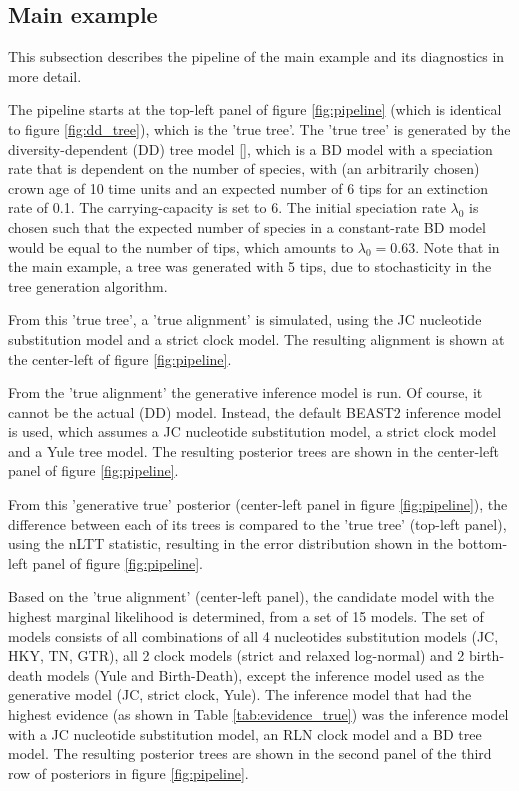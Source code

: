 \newpage

\subsection{Main example}
\label{subsec:main_example}

This subsection describes the pipeline of the main example 
and its diagnostics in more detail. 

The pipeline starts at the top-left panel of figure \ref{fig:pipeline} (which 
is identical to figure \ref{fig:dd_tree}),
which is the 'true tree'.
The 'true tree' is generated by the diversity-dependent (DD) 
tree model [\citep{DDD, etienne2012diversity}],
which is a BD model with a speciation rate that is dependent on the number of species,
with (an arbitrarily chosen) crown age of 10 time units 
and an expected number of 6 tips for an extinction rate of 0.1. 
The carrying-capacity is set to 6. 
The initial speciation rate $\lambda_0$ is chosen 
such that the expected number of species in a constant-rate BD model 
would be equal to the number of tips, which amounts to $\lambda_0 = 0.63$.
Note that in the main example, a tree was generated with 5 tips, due
to stochasticity in the tree generation algorithm.

From this 'true tree', a 'true alignment' is simulated, using
the JC nucleotide substitution model and a strict clock model.
The resulting alignment is shown at the center-left
of figure \ref{fig:pipeline}.

From the 'true alignment' the generative inference model is run.
Of course, it cannot be the actual (DD) model. Instead, the
default BEAST2 inference model is used, which assumes a JC nucleotide
substitution model, a strict clock model and a Yule tree model.
The resulting posterior trees are shown in the
center-left panel of figure \ref{fig:pipeline}.

From this 'generative true' posterior (center-left panel in figure \ref{fig:pipeline}), the difference between each of its trees is
compared to the 'true tree' (top-left panel), using the nLTT statistic,
resulting in the error distribution shown in the bottom-left panel
of figure \ref{fig:pipeline}.

Based on the 'true alignment' (center-left panel), the candidate model
with the highest marginal likelihood is determined, from a set of 
15 models. The set of models consists of all combinations
of all 4 nucleotides substitution models (JC, HKY, TN, GTR),
all 2 clock models (strict and relaxed log-normal) and 2 birth-death
models (Yule and Birth-Death), except the inference model used as the
generative model (JC, strict clock, Yule). 
The inference model that had the highest evidence 
(as shown in Table \ref{tab:evidence_true}) was 
the inference model with a JC nucleotide substitution model,
an RLN clock model and a BD tree model.
The resulting posterior trees are shown in the second panel
of the third row of posteriors in figure \ref{fig:pipeline}.

